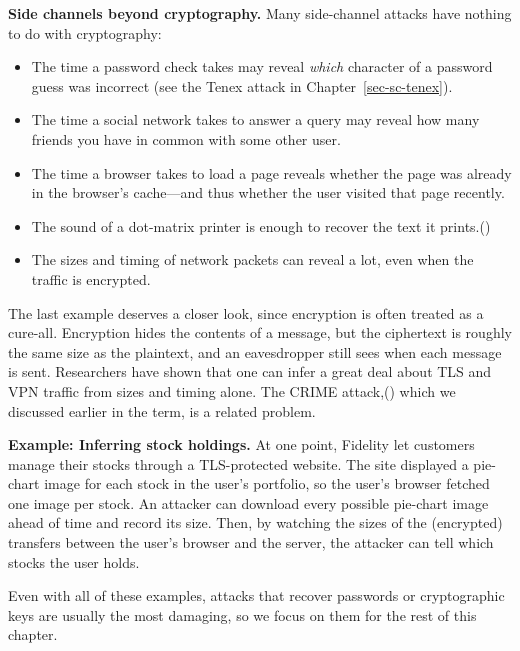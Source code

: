 \documentclass[
  letterpaper,
]{scrbook}
\theoremstyle{definition}
\theoremstyle{plain}
\theoremstyle{plain}
\theoremstyle{remark}
\begin{document}
\textbf{Side channels beyond cryptography.} Many side-channel attacks
have nothing to do with cryptography:

\begin{itemize}
\item
  The time a password check takes may reveal \emph{which} character of a
  password guess was incorrect (see the Tenex attack in
  Chapter~\ref{sec-sc-tenex}).
\item
  The time a social network takes to answer a query may reveal how many
  friends you have in common with some other user.
\item
  The time a browser takes to load a page reveals whether the page was
  already in the browser's cache---and thus whether the user visited
  that page recently.
\item
  The sound of a dot-matrix printer is enough to recover the text it
  prints.()
\item
  The sizes and timing of network packets can reveal a lot, even when
  the traffic is encrypted.
\end{itemize}

The last example deserves a closer look, since encryption is often
treated as a cure-all. Encryption hides the contents of a message, but
the ciphertext is roughly the same size as the plaintext, and an
eavesdropper still sees when each message is sent. Researchers have
shown that one can infer a great deal about TLS and VPN traffic from
sizes and timing alone. The CRIME attack,() which we discussed earlier in the term, is a related
problem. {}

\textbf{Example: Inferring stock holdings.} At one point, Fidelity let
customers manage their stocks through a TLS-protected website. The site
displayed a pie-chart image for each stock in the user's portfolio, so
the user's browser fetched one image per stock. An attacker can download
every possible pie-chart image ahead of time and record its size. Then,
by watching the sizes of the (encrypted) transfers between the user's
browser and the server, the attacker can tell which stocks the user
holds.

Even with all of these examples, attacks that recover passwords or
cryptographic keys are usually the most damaging, so we focus on them
for the rest of this chapter.
\end{document}
